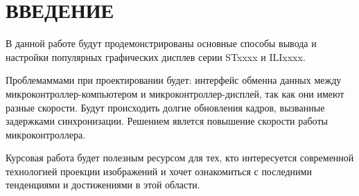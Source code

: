 \chapter*{ВВЕДЕНИЕ}

	В данной работе будут продемонстрированы основные способы вывода и настройки популярных графических дисплев серии STxxxx и ILIxxxx.
	
	Проблемаммами при проектировании будет: интерфейс обменна данных между микроконтроллер-компьютером и микроконтроллер-дисплей, так как они имеют разные скорости. Будут происходить долгие обновления кадров, вызванные задержками синхронизации. Решением явлется повышение скорости работы микроконтроллера.
	
	Курсовая работа будет полезным ресурсом для тех, кто интересуется современной технологией проекции изображений и хочет ознакомиться с последними тенденциями и достижениями в этой области.

	
	
	
